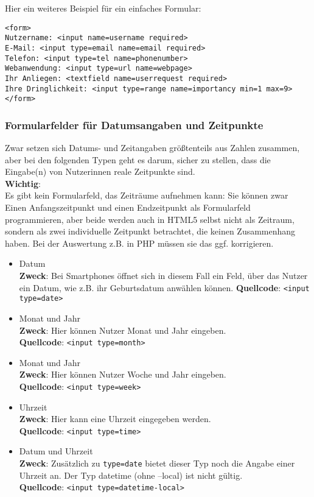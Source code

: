 Hier ein weiteres Beispiel für ein einfaches Formular:

\begin{verbatim}
<form>
Nutzername: <input name=username required>
E-Mail: <input type=email name=email required>
Telefon: <input type=tel name=phonenumber>
Webanwendung: <input type=url name=webpage>
Ihr Anliegen: <textfield name=userrequest required>
Ihre Dringlichkeit: <input type=range name=importancy min=1 max=9>
</form>
\end{verbatim}

\subsubsection{Formularfelder für Datumsangaben und Zeitpunkte}

Zwar setzen sich Datums- und Zeitangaben größtenteils aus Zahlen zusammen, aber bei den folgenden Typen geht es darum, sicher zu stellen, dass die Eingabe(n) von Nutzerinnen reale Zeitpunkte sind.\\

\textbf{Wichtig}:\\

Es gibt kein Formularfeld, das Zeiträume aufnehmen kann: Sie können zwar Einen Anfangszeitpunkt und einen Endzeitpunkt als Formularfeld programmieren, aber beide werden auch in HTML5 selbst nicht als Zeitraum, sondern als zwei individuelle Zeitpunkt betrachtet, die keinen Zusammenhang haben. Bei der Auswertung z.B. in PHP müssen sie das ggf. \glqq{}korrigieren\grqq{}.

\begin{itemize}
	\item Datum\\
	\textbf{Zweck}: Bei Smartphones öffnet sich in diesem Fall ein Feld, über das Nutzer ein Datum, wie z.B. ihr Geburtsdatum anwählen können.	
	\textbf{Quellcode}: \verb|<input type=date>|
	
	\item Monat und Jahr\\
	\textbf{Zweck}: Hier können Nutzer Monat und Jahr eingeben.\\	
	\textbf{Quellcode}: \verb|<input type=month>|

	\item Monat und Jahr\\
	\textbf{Zweck}: Hier können Nutzer Woche und Jahr eingeben.\\	
	\textbf{Quellcode}: \verb|<input type=week>|
	
	\item Uhrzeit\\	
	\textbf{Zweck}: Hier kann eine Uhrzeit eingegeben werden.\\	
	\textbf{Quellcode}: \verb|<input type=time>|

	\item Datum und Uhrzeit\\
	\textbf{Zweck}: Zusätzlich zu \verb|type=date| bietet dieser Typ noch die Angabe einer Uhrzeit an. Der Typ datetime (ohne –local) ist nicht gültig.\\
	\textbf{Quellcode}: \verb|<input type=datetime-local>|
\end{itemize}

